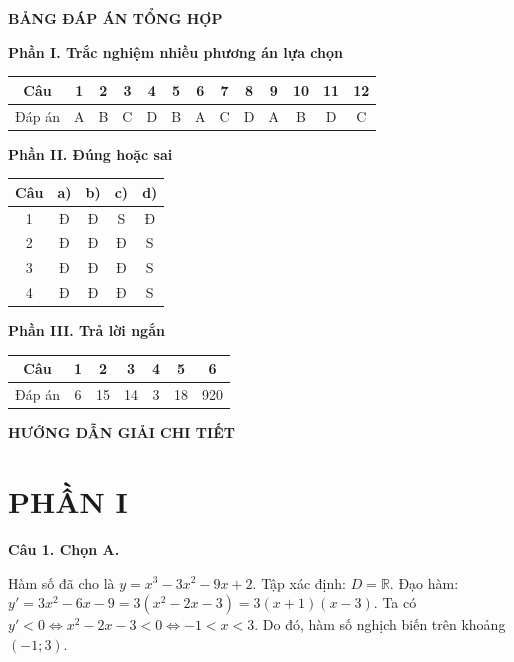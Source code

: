 \documentclass[12pt,a4paper]{article}
\newcommand{\loigiai}[1]{\par\medskip\Needspace{4\baselineskip}\noindent\textbf{#1}\par\nobreak}
\begin{document}
\newpage\pagestyle{answers}
\begin{center}\Large\textbf{BẢNG ĐÁP ÁN TỔNG HỢP}\end{center}
\textbf{Phần I. Trắc nghiệm nhiều phương án lựa chọn}
\begin{center}
\renewcommand{\arraystretch}{1.5}
\begin{tabular}{|c|*{12}{c|}}\hline
Câu & 1&2&3&4&5&6&7&8&9&10&11&12\\\hline
Đáp án & A & B & C & D & B & A & C & D & A & B & D & C \\\hline
\end{tabular}
\end{center}

\textbf{Phần II. Đúng hoặc sai}
\begin{center}
\renewcommand{\arraystretch}{1.4}
\begin{tabular}{|c|c|c|c|c|}\hline
Câu & a) & b) & c) & d)\\\hline
1 & Đ & Đ & S & Đ\\\hline
2 & Đ & Đ & Đ & S\\\hline
3 & Đ & Đ & Đ & S\\\hline
4 & Đ & Đ & Đ & S\\\hline
\end{tabular}
\end{center}

\textbf{Phần III. Trả lời ngắn}
\begin{center}
\renewcommand{\arraystretch}{1.5}
\begin{tabular}{|c|c|c|c|c|c|c|}\hline
Câu & 1 & 2 & 3 & 4 & 5 & 6\\\hline
Đáp án & 6 & 15 & 14 & 3 & 18 & 920 \\\hline
\end{tabular}
\end{center}

\vspace{0.5cm}
\begin{center}
\large\textbf{HƯỚNG DẪN GIẢI CHI TIẾT}
\end{center}

\section*{PHẦN I}

\loigiai{Câu 1. Chọn A.}
Hàm số đã cho là $y=x^3-3x^2-9x+2$.
Tập xác định: $D=\mathbb{R}$.
Đạo hàm: $y'=3x^2-6x-9=3(x^2-2x-3)=3(x+1)(x-3)$.
Ta có $y'<0 \iff x^2-2x-3 < 0 \iff -1 < x < 3$.
Do đó, hàm số nghịch biến trên khoảng $(-1;3)$.
\end{document}

